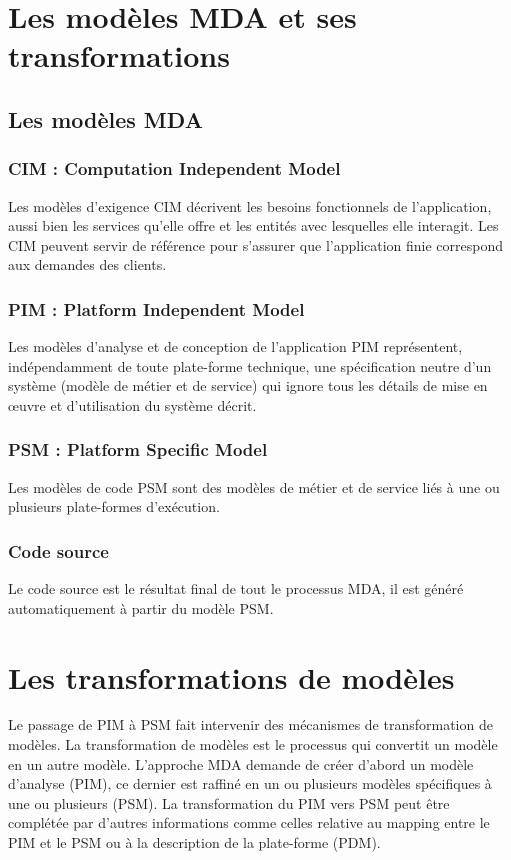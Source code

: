 \documentclass[
10pt, %
a4paper, %
oneside, %
headinclude,footinclude, %
BCOR5mm, %
]{report}
\begin{document}
		\section{Les modèles MDA et ses transformations}
					
		\subsection{Les modèles MDA}
		\subsubsection{ CIM : Computation Independent Model }
		Les  modèles d'exigence CIM décrivent les besoins fonctionnels de l'application, aussi bien les services qu'elle offre et les entités avec lesquelles elle interagit. Les CIM peuvent servir de référence pour s'assurer que l'application finie correspond aux demandes des clients.
		\subsubsection{ PIM : Platform Independent Model}
		Les modèles d’analyse et de conception de l’application PIM représentent, indépendamment de toute plate-forme technique, une  spécification neutre d'un système (modèle de métier et de service) qui ignore tous les détails de mise en œuvre et d’utilisation du système décrit.
		\subsubsection{PSM  : Platform Specific Model}
		Les modèles de code PSM sont des modèles de métier et de service liés  à une ou plusieurs plate-formes d’exécution.
		\subsubsection{Code source}
		Le code source est le résultat final de tout le processus MDA, il est généré automatiquement à partir du modèle PSM.
		\section{Les transformations de modèles}
		Le passage de PIM à PSM fait intervenir des mécanismes de transformation de modèles. La transformation de modèles est le processus qui convertit un modèle en un autre modèle.
		L'approche  MDA demande de créer d'abord un modèle d’analyse (PIM), ce dernier est raffiné en un ou plusieurs modèles spécifiques à une ou plusieurs (PSM). 
    La transformation du PIM vers PSM peut être complétée par d’autres informations comme celles relative au mapping entre le PIM et le PSM ou à la description de la plate-forme (PDM).
    
\end{document}
